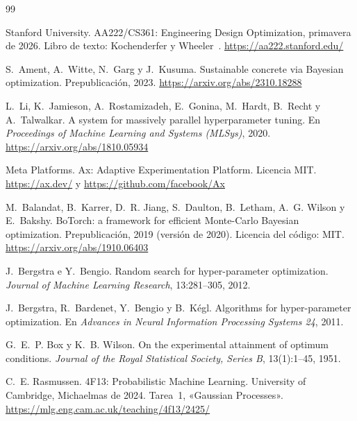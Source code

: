 \begin{thebibliography}{99}
\small

Stanford University.
\newblock AA222/CS361: Engineering Design Optimization, primavera de 2026.
\newblock Libro de texto: Kochenderfer y Wheeler~\cite{kw}.
\newblock \url{https://aa222.stanford.edu/}

S.~Ament, A.~Witte, N.~Garg y J.~Kusuma.
\newblock Sustainable concrete via Bayesian optimization.
\newblock Prepublicación, 2023.
\newblock \url{https://arxiv.org/abs/2310.18288}

L.~Li, K.~Jamieson, A.~Rostamizadeh, E.~Gonina, M.~Hardt, B.~Recht y A.~Talwalkar.
\newblock A system for massively parallel hyperparameter tuning.
\newblock En \emph{Proceedings of Machine Learning and Systems (MLSys)}, 2020.
\newblock \url{https://arxiv.org/abs/1810.05934}

Meta Platforms.
\newblock Ax: Adaptive Experimentation Platform. Licencia MIT.
\newblock \url{https://ax.dev/} y \url{https://github.com/facebook/Ax}

M.~Balandat, B.~Karrer, D.~R. Jiang, S.~Daulton, B.~Letham, A.~G. Wilson y E.~Bakshy.
\newblock BoTorch: a framework for efficient Monte-Carlo Bayesian optimization.
\newblock Prepublicación, 2019 (versión de 2020). Licencia del código: MIT.
\newblock \url{https://arxiv.org/abs/1910.06403}

J.~Bergstra e Y.~Bengio.
\newblock Random search for hyper-parameter optimization.
\newblock \emph{Journal of Machine Learning Research}, 13:281--305, 2012.

J.~Bergstra, R.~Bardenet, Y.~Bengio y B.~Kégl.
\newblock Algorithms for hyper-parameter optimization.
\newblock En \emph{Advances in Neural Information Processing Systems 24}, 2011.

G.~E.~P. Box y K.~B. Wilson.
\newblock On the experimental attainment of optimum conditions.
\newblock \emph{Journal of the Royal Statistical Society, Series B}, 13(1):1--45, 1951.

C.~E. Rasmussen.
\newblock 4F13: Probabilistic Machine Learning.
\newblock University of Cambridge, Michaelmas de 2024. Tarea~1, «Gaussian Processes».
\newblock \url{https://mlg.eng.cam.ac.uk/teaching/4f13/2425/}


\end{thebibliography}

